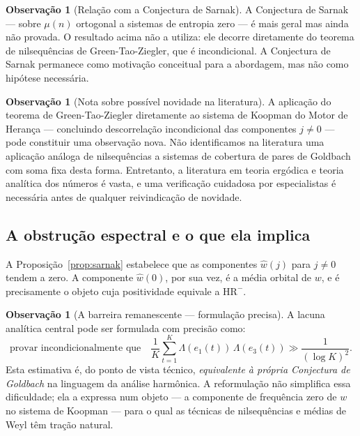 \documentclass[12pt,a4paper]{article}
\theoremstyle{definition}
\newtheorem{remark}[theorem]{Observação}
\newcommand{\HRm}{\mathrm{HR}^{-}}
\begin{document}
	\begin{remark}[Relação com a Conjectura de Sarnak]
		\label{rem:sarnak}
		A Conjectura de Sarnak \cite{sarnak} — sobre $\mu(n)$ ortogonal a
		sistemas de entropia zero — é mais geral mas ainda não provada. O
		resultado acima não a utiliza: ele decorre diretamente do teorema de
		nilsequências de Green-Tao-Ziegler, que é incondicional. A Conjectura
		de Sarnak permanece como motivação conceitual para a abordagem, mas
		não como hipótese necessária.
	\end{remark}
	
	\begin{remark}[Nota sobre possível novidade na literatura]
		\label{rem:novidade}
		A aplicação do teorema de Green-Tao-Ziegler diretamente ao sistema
		de Koopman do Motor de Herança — concluindo descorrelação incondicional
		das componentes $j \neq 0$ — pode constituir uma observação nova.
		Não identificamos na literatura uma aplicação análoga de nilsequências
		a sistemas de cobertura de pares de Goldbach com soma fixa desta forma.
		Entretanto, a literatura em teoria ergódica e teoria analítica dos
		números é vasta, e uma verificação cuidadosa por especialistas é
		necessária antes de qualquer reivindicação de novidade.
	\end{remark}
	
	\subsection{A obstrução espectral e o que ela implica}
	
	A Proposição~\ref{prop:sarnak} estabelece que as componentes
	$\widehat{w}(j)$ para $j \neq 0$ tendem a zero. A componente
	$\widehat{w}(0)$, por sua vez, é a média orbital de $w$, e é
	precisamente o objeto cuja positividade equivale a $\HRm$.
	
	\begin{remark}[A barreira remanescente — formulação precisa]
		\label{rem:barreira}
		A lacuna analítica central pode ser formulada com precisão como:
		\[
		\text{provar incondicionalmente que}\quad
		\frac{1}{K}\sum_{t=1}^K \Lambda(e_1(t))\,\Lambda(e_3(t)) \gg
		\frac{1}{(\log K)^2}.
		\]
		Esta estimativa é, do ponto de vista técnico,
		\emph{equivalente à própria Conjectura de Goldbach} na linguagem da
		análise harmônica. A reformulação não simplifica essa dificuldade;
		ela a expressa num objeto — a componente de frequência zero de $w$
		no sistema de Koopman — para o qual as técnicas de nilsequências e
		médias de Weyl têm tração natural.
	\end{remark}
	
\end{document}

